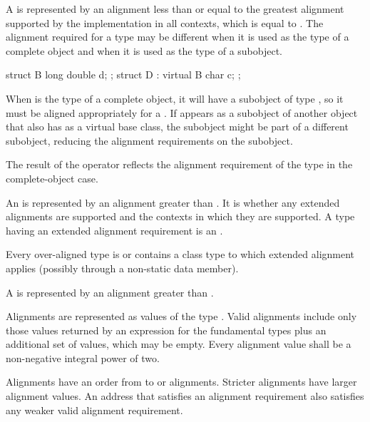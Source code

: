 \pnum
A  is represented by an alignment
less than or equal to the greatest alignment supported by the implementation in
all contexts, which is equal to
.
The alignment required for a type may be different when it is used as the type
of a complete object and when it is used as the type of a subobject.
\begin{example}
\begin{codeblock}
struct B { long double d; };
struct D : virtual B { char c; };
\end{codeblock}

When  is the type of a complete object, it will have a subobject of
type , so it must be aligned appropriately for a .
If  appears as a subobject of another object that also has 
as a virtual base class, the  subobject might be part of a different
subobject, reducing the alignment requirements on the  subobject.
\end{example}
The result of the  operator reflects the alignment
requirement of the type in the complete-object case.

\pnum
An  is represented by an alignment
greater than . It is 
whether any extended alignments are supported and the contexts in which they are
supported. A type having an extended alignment
requirement is an .
\begin{note}
Every over-aligned type is or contains a class type
to which extended alignment applies (possibly through a non-static data member).
\end{note}
A  is represented by
an alignment greater than .

\pnum
Alignments are represented as values of the type .
Valid alignments include only those values returned by an 
expression for the fundamental types plus an additional 
set of values, which may be empty.
Every alignment value shall be a non-negative integral power of two.

\pnum
Alignments have an order from  to
 or  alignments. Stricter
alignments have larger alignment values. An address that satisfies an alignment
requirement also satisfies any weaker valid alignment requirement.

